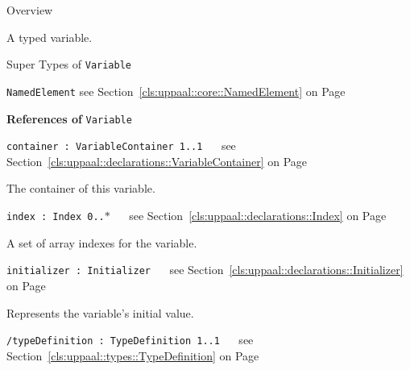 	\begin{longdescription}
		\item[Overview] 		
				

	

		A typed variable.		
		\item[Super Types of \texttt{Variable}] ~
			\begin{longdescription}
				\item[\texttt{NamedElement}] see Section~\ref{cls:uppaal::core::NamedElement} on Page~\pageref{cls:uppaal::core::NamedElement}						\end{longdescription}
		
	
			\item[\textbf{References of} \texttt{Variable}] ~
			\begin{longdescription}
	\item[\texttt{container : VariableContainer 	\symbol{"5B}1..1\symbol{"5D}
}] ~
	see Section~\ref{cls:uppaal::declarations::VariableContainer} on Page~\pageref{cls:uppaal::declarations::VariableContainer}
	
	\nopagebreak
		
				

	

		The container of this variable.		
	\item[\texttt{index : Index 	\symbol{"5B}0..$*$\symbol{"5D}
}] ~
	see Section~\ref{cls:uppaal::declarations::Index} on Page~\pageref{cls:uppaal::declarations::Index}
	
	\nopagebreak
		
				

	

		A set of array indexes for the variable.		
	\item[\texttt{initializer : Initializer 	}] ~
	see Section~\ref{cls:uppaal::declarations::Initializer} on Page~\pageref{cls:uppaal::declarations::Initializer}
	
	\nopagebreak
		
				

	

		Represents the variable's initial value.		
	\item[\texttt{/typeDefinition : TypeDefinition 	\symbol{"5B}1..1\symbol{"5D}
}] ~
	see Section~\ref{cls:uppaal::types::TypeDefinition} on Page~\pageref{cls:uppaal::types::TypeDefinition}
	
	\nopagebreak
		
				

	


\end{longdescription}
\end{longdescription}
